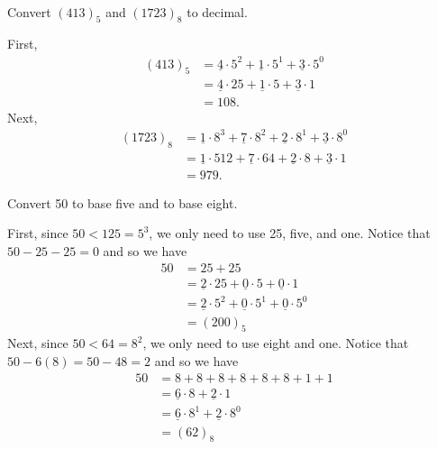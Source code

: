 \begin{exam}
\label{exam_quinary_octal}
~
    \begin{apart}
        \item Convert $(413)_5$ and $(1723)_8$ to decimal.
            \begin{soln}
                First, 
                    \begin{align*}
                    (413)_5 & =\underline{4}\cdot 5^2 +\underline{1}\cdot 5^1 +\underline{3}\cdot 5^0\\
                    &=\underline{4}\cdot 25 +\underline{1}\cdot 5 +\underline{3}\cdot 1 \\
                    & = 108.
                    \end{align*}
                Next, 
                    \begin{align*}
                    (1723)_8 & =\underline{1}\cdot 8^3 +\underline{7}\cdot 8^2 +\underline{2}\cdot 8^1 +\underline{3}\cdot 8^0 \\
                    &=\underline{1}\cdot 512 +\underline{7}\cdot 64 +\underline{2}\cdot 8 +\underline{3}\cdot 1 \\
                    & = 979.
                    \end{align*}
            \end{soln}
        \item Convert 50 to base five and to base eight.
            \begin{soln}
                First, since $50 < 125 = 5^3$, we only need to use 25, five, and one.  Notice that $50-25-25=0$ and so we have
                   \begin{align*}
                    50 & = 25+25 \\
                    & =\underline{2}\cdot 25 +\underline{0}\cdot 5 + \underline{0}\cdot 1  \\
                    & = \underline{2}\cdot 5^2 +  \underline{0} \cdot 5^1 +  \underline{0} \cdot 5^0 \\
                    & = (200)_5
                    \end{align*}
                Next, since $50 < 64 = 8^2$, we only need to use eight and one.  Notice that $50-6(8) = 50-48 = 2$ and so we have
                    \begin{align*}
                    50 & = 8+8+8+8+8+8+1+1 \\
                    & =\underline{6}\cdot 8 + \underline{2}\cdot 1  \\
                    & = \underline{6} \cdot 8^1 +  \underline{2} \cdot 8^0 \\
                    & = (62)_8
                    \end{align*}
            \end{soln}
    \end{apart}
\end{exam}

